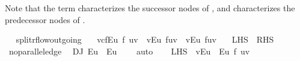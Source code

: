 \begin{isabellebody}
\begin{isamarkuptext}
  Note that the term  characterizes the successor nodes of ,
  and  characterizes the predecessor nodes of .%
\end{isamarkuptext}\isamarkuptrue%
\ \isamarkupfalse%
\ split{\isacharunderscore}rflow{\isacharunderscore}outgoing{\isacharcolon}\ \isanewline
\ \ {\isachardoublequoteopen}{\isacharparenleft}{\isasymSum}v{\isasymin}cf{\isachardot}E{\isacharbackquote}{\isacharbackquote}{\isacharbraceleft}u{\isacharbraceright}{\isachardot}\ f{\isacharprime}\ {\isacharparenleft}u{\isacharcomma}v{\isacharparenright}{\isacharparenright}\ {\isacharequal}\ {\isacharparenleft}{\isasymSum}v{\isasymin}E{\isacharbackquote}{\isacharbackquote}{\isacharbraceleft}u{\isacharbraceright}{\isachardot}\ f{\isacharprime}{\isacharparenleft}u{\isacharcomma}v{\isacharparenright}{\isacharparenright}\ {\isacharplus}\ {\isacharparenleft}{\isasymSum}v{\isasymin}E{\isasyminverse}{\isacharbackquote}{\isacharbackquote}{\isacharbraceleft}u{\isacharbraceright}{\isachardot}\ f{\isacharprime}{\isacharparenleft}u{\isacharcomma}v{\isacharparenright}{\isacharparenright}{\isachardoublequoteclose}\isanewline
\ \ {\isacharparenleft}\ {\isachardoublequoteopen}{\isacharquery}LHS\ {\isacharequal}\ {\isacharquery}RHS{\isachardoublequoteclose}{\isacharparenright}\isanewline
%
\isadelimproof
%
\endisadelimproof
%
\isatagproof
{}\isamarkupfalse%
\ {\isacharminus}\isanewline
\ \ \isamarkupfalse%
\ no{\isacharunderscore}parallel{\isacharunderscore}edge\ \isamarkupfalse%
\ DJ{\isacharcolon}\ {\isachardoublequoteopen}E{\isacharbackquote}{\isacharbackquote}{\isacharbraceleft}u{\isacharbraceright}\ {\isasyminter}\ E{\isasyminverse}{\isacharbackquote}{\isacharbackquote}{\isacharbraceleft}u{\isacharbraceright}\ {\isacharequal}\ {\isacharbraceleft}{\isacharbraceright}{\isachardoublequoteclose}\ \isamarkupfalse%
\ auto\isanewline
\isanewline
\ \ \isamarkupfalse%
\ {\isachardoublequoteopen}{\isacharquery}LHS\ {\isacharequal}\ {\isacharparenleft}{\isasymSum}v{\isasymin}E{\isacharbackquote}{\isacharbackquote}{\isacharbraceleft}u{\isacharbraceright}\ {\isasymunion}\ E{\isasyminverse}{\isacharbackquote}{\isacharbackquote}{\isacharbraceleft}u{\isacharbraceright}{\isachardot}\ f{\isacharprime}\ {\isacharparenleft}u{\isacharcomma}v{\isacharparenright}{\isacharparenright}{\isachardoublequoteclose}\isanewline

\end{isabellebody}
